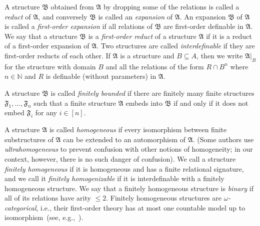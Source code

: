 \documentclass{amsart}
\theoremstyle{definition}
\theoremstyle{remark}
\numberwithin{equation}{section}
\newcommand{\fa}{\mathfrak{A}}
\newcommand{\fb}{\mathfrak{B}}
\newcommand{\bA}{\mathfrak{A}}
\newcommand{\bB}{\mathfrak{B}}
\newcommand{\bF}{\mathfrak{F}}
\begin{document}
    A structure $\bB$ obtained from $\bA$ by dropping some of the relations is called a \emph{reduct} of $\bA$, and conversely $\bB$ is called an \emph{expansion} of $\bA$. 
    An expansion $\bB$ of $\bA$ is called a \emph{first-order expansion} if all relations of $\bB$ are first-order definable in $\bA$. We say that a structure $\fb$ is a \emph{first-order reduct} of a structure $\fa$ if 
it is a reduct of a first-order expansion of $\fa$. Two structures are called \emph{interdefinable} if they are first-order reducts of each other.
If $\fa$ is a structure and $B \subseteq A$, then we write $\fa|_B $ for the structure  with domain $B$ and all the relations of the form $R \cap B^n$ where $n \in {\mathbb N}$ and $R$ is definable (without parameters) in $\fa$.


    A structure $\fb$ is called \emph{finitely bounded} if there are finitely many finite structures $\bF_1,\dots,\bF_n$ such that a finite structure $\fa$  embeds into $\fb$ if and only if it does not embed $\bF_i$ for {any} $i \in [n]$. 

    A structure $\bA$ is called \emph{homogeneous} if every isomorphism between finite substructures of $\bA$ can be extended to an automorphism of $\bA$. (Some authors use \emph{ultrahomogeneous} to prevent confusion with other notions of homogeneity; in our context, however, there is no such danger of confusion). We call a structure \emph{finitely homogeneous} if it is homogeneous and has a finite relational signature, and we call it \emph{finitely homogenizable} if it is interdefinable with a finitely homogeneous structure. We say that a finitely homogeneous structure is \emph{binary} if all of its relations have arity $\leq 2$.
    Finitely homogeneous structures are \emph{$\omega$-categorical}, i.e., their first-order theory has at most one countable model up to isomorphism~(see, e.g.,~\cite[Theorem 7.4.1]{HodgesLong}). 
    
    
\end{document}
